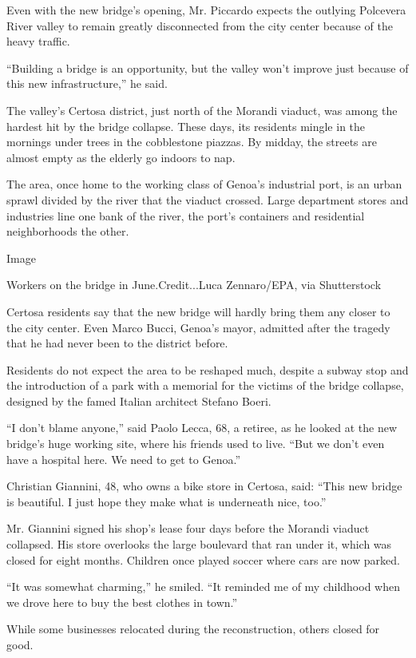 Even with the new bridge's opening, Mr. Piccardo expects the outlying
Polcevera River valley to remain greatly disconnected from the city
center because of the heavy traffic.

``Building a bridge is an opportunity, but the valley won't improve just
because of this new infrastructure,'' he said.

The valley's Certosa district, just north of the Morandi viaduct, was
among the hardest hit by the bridge collapse. These days, its residents
mingle in the mornings under trees in the cobblestone piazzas. By
midday, the streets are almost empty as the elderly go indoors to nap.

The area, once home to the working class of Genoa's industrial port, is
an urban sprawl divided by the river that the viaduct crossed. Large
department stores and industries line one bank of the river, the port's
containers and residential neighborhoods the other.

Image

Workers on the bridge in June.Credit...Luca Zennaro/EPA, via
Shutterstock

Certosa residents say that the new bridge will hardly bring them any
closer to the city center. Even Marco Bucci, Genoa's mayor, admitted
after the tragedy that he had never been to the district before.

Residents do not expect the area to be reshaped much, despite a subway
stop and the introduction of a park with a memorial for the victims of
the bridge collapse, designed by the famed Italian architect Stefano
Boeri.

``I don't blame anyone,'' said Paolo Lecca, 68, a retiree, as he looked
at the new bridge's huge working site, where his friends used to live.
``But we don't even have a hospital here. We need to get to Genoa.''

Christian Giannini, 48, who owns a bike store in Certosa, said: ``This
new bridge is beautiful. I just hope they make what is underneath nice,
too.''

Mr. Giannini signed his shop's lease four days before the Morandi
viaduct collapsed. His store overlooks the large boulevard that ran
under it, which was closed for eight months. Children once played soccer
where cars are now parked.

``It was somewhat charming,'' he smiled. ``It reminded me of my
childhood when we drove here to buy the best clothes in town.''

While some businesses relocated during the reconstruction, others closed
for good.

